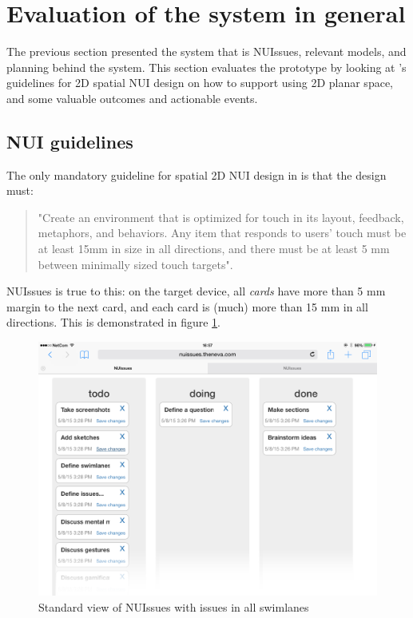 \section{Evaluation of the system in general}

The previous section presented the system that is NUIssues, relevant models, and planning behind the system. This section evaluates the prototype by looking at \textcite[34]{wigdow-wixon:brave-nui-world:2011}'s guidelines for 2D spatial NUI design on how to support using 2D planar space, and some valuable outcomes and actionable events.

\subsection{NUI guidelines}

The only mandatory guideline for spatial 2D NUI design in \textcite[34]{wigdow-wixon:brave-nui-world:2011} is that the design must:

\begin{quote}
"Create an environment that is optimized for touch in its layout, feedback, metaphors, and behaviors. Any item that responds to users' touch must be at least 15mm in size in all directions, and there must be at least 5 mm between minimally sized touch targets".
\end{quote}

NUIssues is true to this: on the target device, all \textit{cards} have more than 5 mm margin to the next card, and each card is (much) more than 15 mm in all directions. This is demonstrated in figure \ref{figure:standard-view}.

\begin{figure}[H]
    \centerline{\includegraphics[scale=0.4]{images/nuissues-screenshots/01-default-all-swimlanes}}
    \caption{Standard view of NUIssues with issues in all swimlanes}
    \label{figure:standard-view}
\end{figure}

